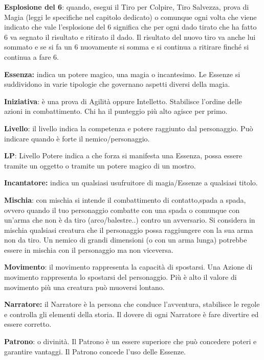 \documentclass[a4paper,11pt,twoside,openany]{book}
\begin{document}
\textbf{Esplosione del 6}: quando, esegui il Tiro per Colpire, Tiro Salvezza, prova di Magia (leggi le specifiche nel capitolo dedicato) o comunque ogni volta che viene indicato che vale l'esplosione del 6 significa che per ogni dado tirato che ha fatto 6 va segnato il risultato e ritirato il dado. Il risultato del nuovo tiro va anche lui sommato e se si fa un 6 nuovamente si somma e si continua a ritirare finché si continua a fare 6.

\textbf{Essenza:} indica un potere magico, una magia o incantesimo. Le Essenze si suddividono in varie tipologie che governano aspetti diversi della magia.

\textbf{Iniziativa}: è una prova di Agilità oppure Intelletto. Stabilisce l'ordine delle azioni in combattimento. Chi ha il punteggio più alto agisce per primo.

\textbf{Livello}: il livello indica la competenza e potere raggiunto dal personaggio. Può indicare quando è forte il nemico/personaggio. 

\textbf{LP}: Livello Potere indica a che forza si manifesta una Essenza, possa essere tramite un oggetto o tramite un potere magico di un mostro.

\textbf{Incantatore:} indica un qualsiasi usufruitore di magia/Essenze a qualsiasi titolo.

\textbf{Mischia}: con mischia si intende il combattimento di contatto,spada a spada, ovvero quando il tuo personaggio combatte con una spada o comunque con un'arma che non è da tiro (arco/balestre..) contro un avversario.
Si considera in mischia qualsiasi creatura che il personaggio possa raggiungere con la sua arma non da tiro. Un nemico di grandi dimensioni (o con un arma lunga) potrebbe essere in mischia con il personaggio ma non viceversa.

\textbf{Movimento}: il movimento rappresenta la capacità di spostarsi. Una Azione di movimento rappresenta lo spostarsi del personaggio. Più è alto il valore di movimento più una creatura può muoversi lontano.

\textbf{Narratore:} il Narratore è la persona che conduce l'avventura, stabilisce le regole e controlla gli elementi della storia. Il dovere di ogni Narratore è fare divertire ed essere corretto.

\textbf{Patrono}: o divinità. Il Patrono è un essere superiore che può concedere poteri e garantire vantaggi. Il Patrono concede l'uso delle Essenze.
\end{document}
